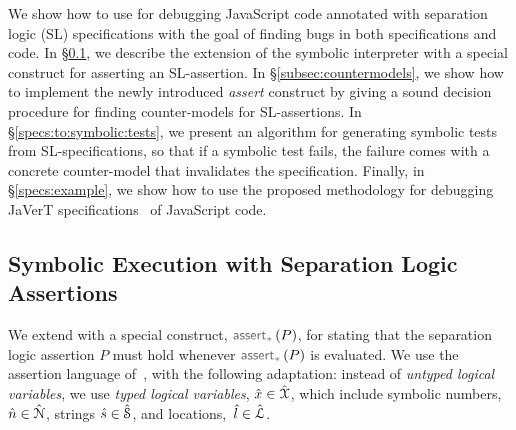 
We show how to use \jilette for debugging JavaScript code annotated with 
separation logic (SL) specifications with the goal of finding bugs in both 
 specifications and code. In \S\ref{subsec:sep:assertions}, we describe the 
extension of the \jsil symbolic interpreter with a special construct for asserting
an SL-assertion. 
In \S\ref{subsec:countermodels}, we show how to implement the newly introduced
\emph{assert} construct by giving a sound decision procedure for finding counter-models 
for SL-assertions.
In \S\ref{specs:to:symbolic:tests}, we present an algorithm  
for generating symbolic tests from SL-specifications, so that if a 
symbolic test fails, the failure comes with a concrete counter-model that invalidates 
the specification. Finally, in \S\ref{specs:example}, we show how to use the 
proposed methodology for debugging JaVerT specifications~\cite{javert} of JavaScript code. 

\subsection{\jsil Symbolic Execution with Separation Logic Assertions}
\label{subsec:sep:assertions}

We extend \jsil with a special construct, $\sepassert(P)$, for stating that 
the separation logic assertion $P$ must hold whenever $\sepassert(P)$ is evaluated. 
We use the assertion language of~\cite{javert}, with the following adaptation:
instead of \emph{untyped logical variables}, we 
use \emph{typed logical variables}, $\hat{x} \in \hat{\mathcal{X}}$, which include 
symbolic numbers, $\hat{n} \in \hat{\mathcal{N}}$, strings $\hat{s} \in \hat{\mathcal{S}}$, 
and locations,~$\hat{l} \in \hat{{\mathcal L}}$. 

